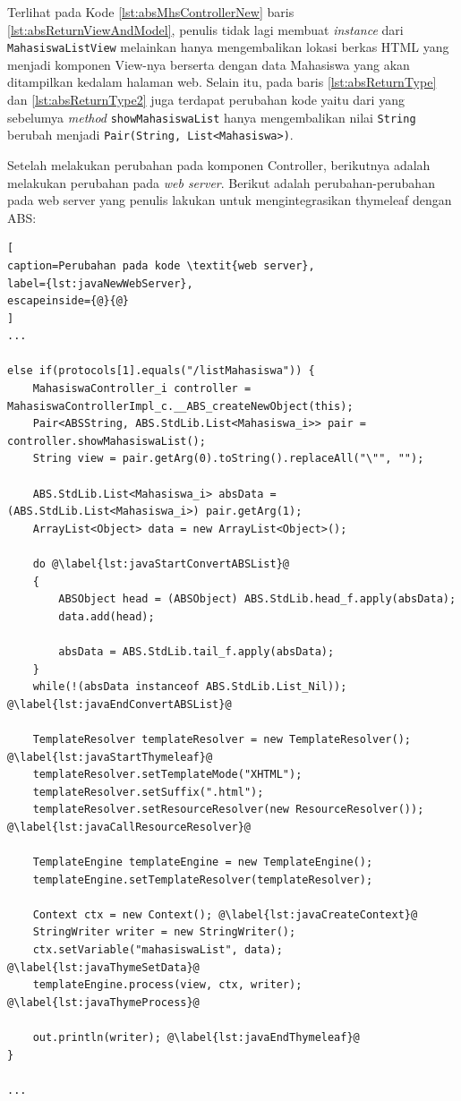 Terlihat pada Kode \ref{lst:absMhsControllerNew} baris \ref{lst:absReturnViewAndModel}, penulis tidak lagi membuat \textit{instance} dari \texttt{MahasiswaListView} melainkan hanya mengembalikan lokasi berkas HTML yang menjadi komponen View-nya berserta dengan data Mahasiswa yang akan ditampilkan kedalam halaman web. Selain itu, pada baris \ref{lst:absReturnType} dan \ref{lst:absReturnType2} juga terdapat perubahan kode yaitu dari yang sebelumya \textit{method} \texttt{showMahasiswaList} hanya mengembalikan nilai \texttt{String} berubah menjadi \texttt{Pair(String, List<Mahasiswa>)}.

Setelah melakukan perubahan pada komponen Controller, berikutnya adalah melakukan perubahan pada \textit{web server}. Berikut adalah perubahan-perubahan pada web server yang penulis lakukan untuk mengintegrasikan thymeleaf dengan ABS:

\begin{lstlisting}[
caption=Perubahan pada kode \textit{web server},
label={lst:javaNewWebServer},
escapeinside={@}{@}
]
...

else if(protocols[1].equals("/listMahasiswa")) {
   	MahasiswaController_i controller = MahasiswaControllerImpl_c.__ABS_createNewObject(this);
   	Pair<ABSString, ABS.StdLib.List<Mahasiswa_i>> pair = controller.showMahasiswaList();
   	String view = pair.getArg(0).toString().replaceAll("\"", "");
   	
   	ABS.StdLib.List<Mahasiswa_i> absData = (ABS.StdLib.List<Mahasiswa_i>) pair.getArg(1);
   	ArrayList<Object> data = new ArrayList<Object>();
           		
	do @\label{lst:javaStartConvertABSList}@
	{
		ABSObject head = (ABSObject) ABS.StdLib.head_f.apply(absData);
		data.add(head);
		
		absData = ABS.StdLib.tail_f.apply(absData);
	}
	while(!(absData instanceof ABS.StdLib.List_Nil)); @\label{lst:javaEndConvertABSList}@
	
	TemplateResolver templateResolver = new TemplateResolver(); @\label{lst:javaStartThymeleaf}@
    templateResolver.setTemplateMode("XHTML");
    templateResolver.setSuffix(".html");
    templateResolver.setResourceResolver(new ResourceResolver()); @\label{lst:javaCallResourceResolver}@
                
    TemplateEngine templateEngine = new TemplateEngine();
    templateEngine.setTemplateResolver(templateResolver);
                
	Context ctx = new Context(); @\label{lst:javaCreateContext}@
	StringWriter writer = new StringWriter();
	ctx.setVariable("mahasiswaList", data); @\label{lst:javaThymeSetData}@
	templateEngine.process(view, ctx, writer); @\label{lst:javaThymeProcess}@
	
	out.println(writer); @\label{lst:javaEndThymeleaf}@
}

...
\end{lstlisting}

